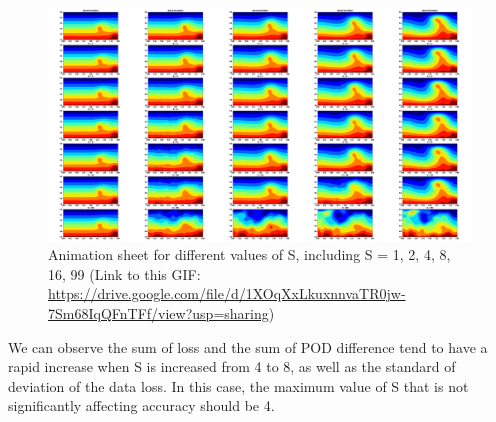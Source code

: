 \begin{figure}[H]
    \centering
    \caption{Animation sheet for different values of S, including S = 1, 2, 4, 8, 16, 99 (Link to this GIF: \url{https://drive.google.com/file/d/1XOqXxLkuxnnvaTR0jw-7Sm68IqQFnTFf/view?usp=sharing})}
    \includegraphics[scale=0.20]{figures/mantle_convection_images/further_testings/FNN_further_testing_sheet.png}
\end{figure}

We can observe the sum of loss and the sum of POD difference tend to have a rapid increase when S is increased from 4 to 8, as well as the standard of deviation of the data loss. In this case, the maximum value of S that is not significantly affecting accuracy should be 4.




